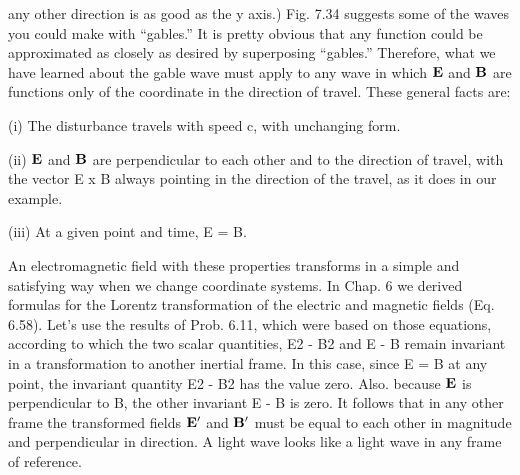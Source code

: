 any other direction is as good as the y axis.) Fig. 7.34 suggests some
of the waves you could make with ``gables.'' It is pretty obvious that
any function could be approximated as closely as desired by superposing
``gables.'' Therefore, what we have learned about the gable
wave must apply to any wave in which $\mathbf{E}$ and $\mathbf{B}$ are functions only
of the coordinate in the direction of travel. These general facts are:

(i) The disturbance travels with speed c, with unchanging
form. 

(ii) $\mathbf{E}$ and $\mathbf{B}$ are perpendicular to each other and to the direction
of travel, with the vector E x B always pointing in the
direction of the travel, as it does in our example.

(iii) At a given point and time, E = B.

An electromagnetic field with these properties transforms in a
simple and satisfying way when we change coordinate systems. In
Chap. 6 we derived formulas for the Lorentz transformation of the
electric and magnetic fields (Eq. 6.58). Let's use the results of
Prob. 6.11, which were based on those equations, according to which
the two scalar quantities, E2 - B2 and E - B remain invariant in a
transformation to another inertial frame. In this case, since E = B
at any point, the invariant quantity E2 - B2 has the value zero. Also.
because $\mathbf{E}$ is perpendicular to B, the other invariant E - B is zero. It
follows that in any other frame the transformed fields $\mathbf{E}'$ and $\mathbf{B}'$ must
be equal to each other in magnitude and perpendicular in direction.
A light wave looks like a light wave in any frame of reference.

\fi
